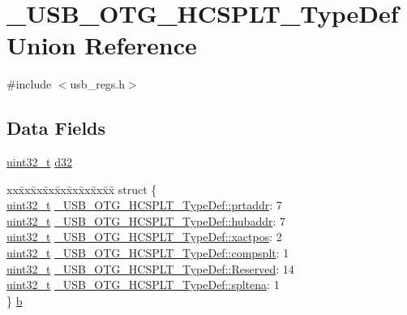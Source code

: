 \hypertarget{union___u_s_b___o_t_g___h_c_s_p_l_t___type_def}{\section{\-\_\-\-U\-S\-B\-\_\-\-O\-T\-G\-\_\-\-H\-C\-S\-P\-L\-T\-\_\-\-Type\-Def Union Reference}
\label{union___u_s_b___o_t_g___h_c_s_p_l_t___type_def}
}


{\ttfamily \#include $<$usb\-\_\-regs.\-h$>$}

\subsection*{Data Fields}
\begin{DoxyCompactItemize}
\item 
\hyperlink{stdint_8h_a435d1572bf3f880d55459d9805097f62}{uint32\-\_\-t} \hyperlink{group___u_s_b___o_t_g___d_r_i_v_e_r_ga2d653fb915c46a2e964a551de1133d6f}{d32}
\item 
\begin{tabbing}
xx\=xx\=xx\=xx\=xx\=xx\=xx\=xx\=xx\=\kill
struct \{\\
\>\hyperlink{stdint_8h_a435d1572bf3f880d55459d9805097f62}{uint32\_t} \hyperlink{group___u_s_b___o_t_g___d_r_i_v_e_r_gacc448e71e7cef60de46bf9164a182940}{\_USB\_OTG\_HCSPLT\_TypeDef::prtaddr}: 7\\
\>\hyperlink{stdint_8h_a435d1572bf3f880d55459d9805097f62}{uint32\_t} \hyperlink{group___u_s_b___o_t_g___d_r_i_v_e_r_gaae0e95bdc2670ea39a5865a11402bbf2}{\_USB\_OTG\_HCSPLT\_TypeDef::hubaddr}: 7\\
\>\hyperlink{stdint_8h_a435d1572bf3f880d55459d9805097f62}{uint32\_t} \hyperlink{group___u_s_b___o_t_g___d_r_i_v_e_r_ga37c594251d0de7c398bcecae8f4a6780}{\_USB\_OTG\_HCSPLT\_TypeDef::xactpos}: 2\\
\>\hyperlink{stdint_8h_a435d1572bf3f880d55459d9805097f62}{uint32\_t} \hyperlink{group___u_s_b___o_t_g___d_r_i_v_e_r_ga13228295441150f61ba577a08d667dc7}{\_USB\_OTG\_HCSPLT\_TypeDef::compsplt}: 1\\
\>\hyperlink{stdint_8h_a435d1572bf3f880d55459d9805097f62}{uint32\_t} \hyperlink{group___u_s_b___o_t_g___d_r_i_v_e_r_gae2693cd0a5bd810cb890f111e78c0b35}{\_USB\_OTG\_HCSPLT\_TypeDef::Reserved}: 14\\
\>\hyperlink{stdint_8h_a435d1572bf3f880d55459d9805097f62}{uint32\_t} \hyperlink{group___u_s_b___o_t_g___d_r_i_v_e_r_ga718ce486934cafa52254fe9597562689}{\_USB\_OTG\_HCSPLT\_TypeDef::spltena}: 1\\
\} \hyperlink{group___u_s_b___o_t_g___d_r_i_v_e_r_gaa7ea6e39be76343ff5107c31fa104a0e}{b}\\

\end{tabbing}\end{DoxyCompactItemize}


